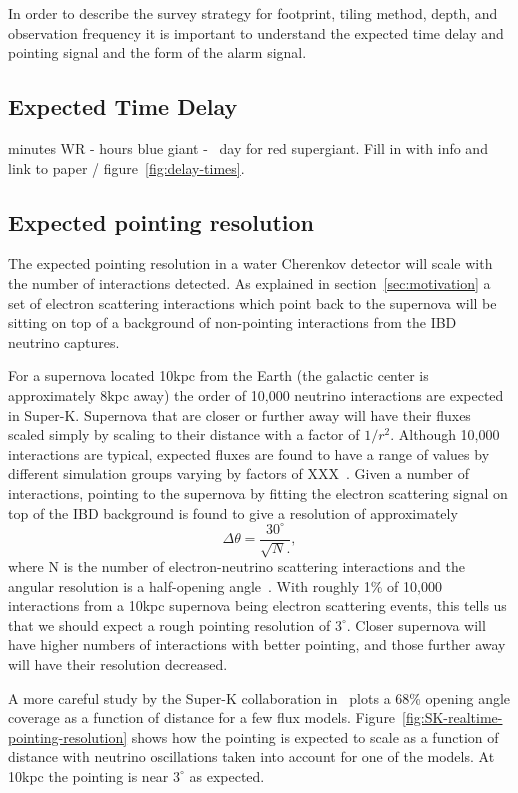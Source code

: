\documentclass[12pt, letterpaper]{article}
\newcommand{\superk}  {Super\nobreakdash-K\xspace}
\begin{document}
In order to describe the survey strategy for footprint, tiling method,
depth, and observation frequency it is important to understand the
expected time delay and pointing signal and the form of the alarm signal.

\subsection{Expected Time Delay}

minutes WR - hours blue giant - ~day for red supergiant. Fill in with
info and link to paper / figure~\ref{fig:delay-times}.

\subsection{Expected pointing resolution}

The expected pointing resolution in a water Cherenkov detector will
scale with the number of interactions detected.  As explained in
section~\ref{sec:motivation} a set of electron scattering interactions which
point back to the supernova will be sitting on top of a background of
non-pointing interactions from the IBD neutrino captures.

For a supernova located 10kpc from the Earth (the galactic center is
approximately 8kpc away) the order of 10,000 neutrino interactions are
expected in \superk.  Supernova that are closer or further away will
have their fluxes scaled simply by scaling to their distance with a
factor of $1/r^2$.  Although 10,000 interactions are typical, expected
fluxes are found to have a range of values by different simulation
groups varying by factors of XXX~\cite{model_references}.  Given a
number of interactions, pointing to the supernova by fitting the
electron scattering signal on top of the IBD background is found to
give a resolution of approximately
%
$$ \Delta \theta = \frac{30^\circ}{\sqrt{N}.}, $$
%
where N is the number of electron-neutrino scattering interactions and
the angular resolution is a half-opening
angle~\cite{2012ARNPS..62...81S}.  With roughly 1\% of 10,000
interactions from a 10kpc supernova being electron scattering events,
this tells us that we should expect a rough pointing resolution of
$3^\circ$.  Closer supernova will have higher numbers of interactions
with better pointing, and those further away will have their
resolution decreased.

A more careful study by the \superk collaboration
in~\cite{2016APh....81...39A} plots a 68\% opening angle coverage as a
function of distance for a few flux
models. Figure~\ref{fig:SK-realtime-pointing-resolution} shows how the
pointing is expected to scale as a function of distance with neutrino
oscillations taken into account for one of the models. At 10kpc the
pointing is near $3^\circ$ as expected.
\end{document}
